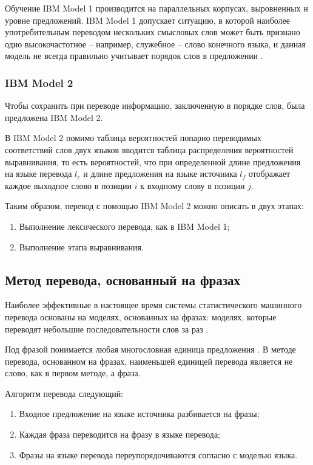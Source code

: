 Обучение IBM Model 1 производится на параллельных корпусах, выровненных н уровне предложений. IBM Model 1 допускает ситуацию, в которой наиболее употребительным переводом нескольких смысловых слов может быть признано одно высокочастотное -- например, служебное -- слово конечного языка, и данная модель не всегда правильно учитывает порядок слов в предложении \cite{smt}.

\subsubsection*{IBM Model 2}

Чтобы сохранить при переводе информацию, заключенную в порядке слов, была предложена IBM Model 2. 

В IBM Model 2 помимо таблица вероятностей попарно переводимых соответствий слов двух языков вводится таблица распределения вероятностей  выравнивания, то есть вероятностей, что при определенной длине предложения на языке перевода $l_e$ и длине предложения на языке источника $l_f$ отображает каждое выходное слово в позиции $i$ к входному слову в позиции $j$.

Таким образом, перевод с помощью IBM Model 2  можно описать в двух этапах:

\begin{enumerate}
	\item Выполнение лексического перевода, как в IBM Model 1;
	\item Выполнение этапа выравнивания.
\end{enumerate}

\subsection{Метод перевода, основанный на фразах}

Наиболее эффективные в настоящее время системы статистического машинного
перевода основаны на моделях, основанных на фразах: моделях, которые переводят небольшие последовательности слов за раз \cite{smt_book}.

Под фразой понимается любая многословная единица предложения \cite{smt_book}. В методе перевода, основанном на фразах, наименьшей единицей перевода является не слово, как в первом методе, а фраза. 

Алгоритм перевода следующий:

\begin{enumerate}
	\item Входное предложение на языке источника разбивается на фразы;
	\item Каждая фраза переводится на фразу в языке перевода;
	\item Фразы на языке перевода переупорядочиваются согласно с моделью языка.
\end{enumerate}


